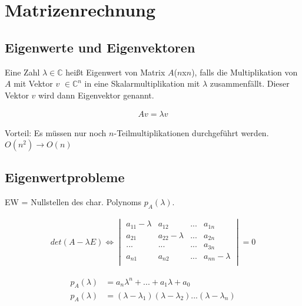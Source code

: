 \documentclass[10pt,a4paper]{article}
\begin{document}
\section{Matrizenrechnung}
\subsection{Eigenwerte und Eigenvektoren}
Eine Zahl $\lambda \in \mathbb{C}$ heißt Eigenwert von Matrix $A$($n$x$n$),
falls die Multiplikation von $A$ mit Vektor $v$ $\in \mathbb{C}^n$ in eine Skalarmultiplikation
mit $\lambda$ zusammenfällt. Dieser Vektor $v$ wird dann Eigenvektor genannt.
  \begin{mdframed}[style=exercise]
    \begin{align}
        Av = \lambda v
    \end{align}
  \end{mdframed}
Vorteil: Es müssen nur noch $n$-Teilmultiplikationen durchgeführt werden.
$O(n^2) \rightarrow O(n)$

\subsection{Eigenwertprobleme}
EW = Nullstellen des char. Polynoms $p_A(\lambda)$.\\
  \begin{mdframed}[style=exercise]
    \begin{align}
        det(A-\lambda E) \Longleftrightarrow 
        \begin{vmatrix}
             a_{11}-\lambda & a_{12} & ...  & a_{1n} \\
             a_{21}& a_{22}-\lambda & ... & a_{2n} \\
              ... & ...  & ...  & a_{3n} \\
             a_{n1} & a_{n2} & ... &  a_{nn}-\lambda\\
        \end{vmatrix} = 0
    \end{align}
  \end{mdframed}
  \begin{mdframed}[style=exercise]
    \begin{align}
        p_A(\lambda) &= a_n \lambda^n +...+ a_1 \lambda + a_0\\
        p_A(\lambda) &= (\lambda - \lambda_1)(\lambda - \lambda_2)...(\lambda - \lambda_n)
    \end{align}
  \end{mdframed}
\end{document}

